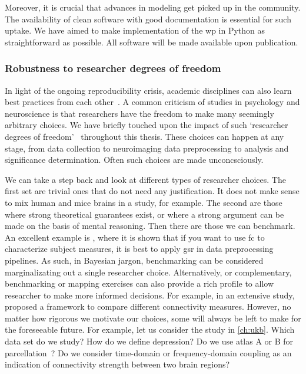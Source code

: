 Moreover, it is crucial that advances in modeling get picked up in the community.
The availability of clean software with good documentation is essential for such uptake.
We have aimed to make implementation of the \gls{wp} in Python as straightforward as possible.
All software will be made available upon publication.

\subsubsection{Robustness to researcher degrees of freedom}
\label{subsec:robustness}

In light of the ongoing reproducibility crisis, academic disciplines can also learn best practices from each other~\textcite{Bell2021}.
A common criticism of studies in psychology and neuroscience is that researchers have the freedom to make many seemingly arbitrary choices.
We have briefly touched upon the impact of such `researcher degrees of freedom'~\parencite{Gelman2013} throughout this thesis.
These choices can happen at any stage, from data collection to neuroimaging data preprocessing to analysis and significance determination.
Often such choices are made unconcsciously.

We can take a step back and look at different types of researcher choices.
%
The first set are trivial ones that do not need any justification.
It does not make sense to mix human and mice brains in a study, for example.
The second are those where strong theoretical guarantees exist, or where a strong argument can be made on the basis of mental reasoning.
%
Then there are those we can benchmark.
An excellent example is \textcite{Li2019a}, where it is shown that if you want to use \gls{fc} to characterize subject measures, it is best to apply \gls{gsr} in data preprocessing pipelines.
As such, in Bayesian jargon, benchmarking can be considered marginalizating out a single researcher choice.
Alternatively, or complementary, benchmarking or mapping exercises can also provide a rich profile to allow researcher to make more informed decisions.
For example, in an extensive study, \textcite{Wang2014} proposed a framework to compare different connectivity measures.
%
However, no matter how rigorous we motivate our choices, some will always be left to make for the foreseeable future.
For example, let us consider the study in \cref{ch:ukb}.
Which data set do we study?
How do we define depression?
Do we use atlas A or B for parcellation~\parencite[see also][]{Dadashkarimi2021}?
Do we consider time-domain or frequency-domain coupling as an indication of connectivity strength between two brain regions?

